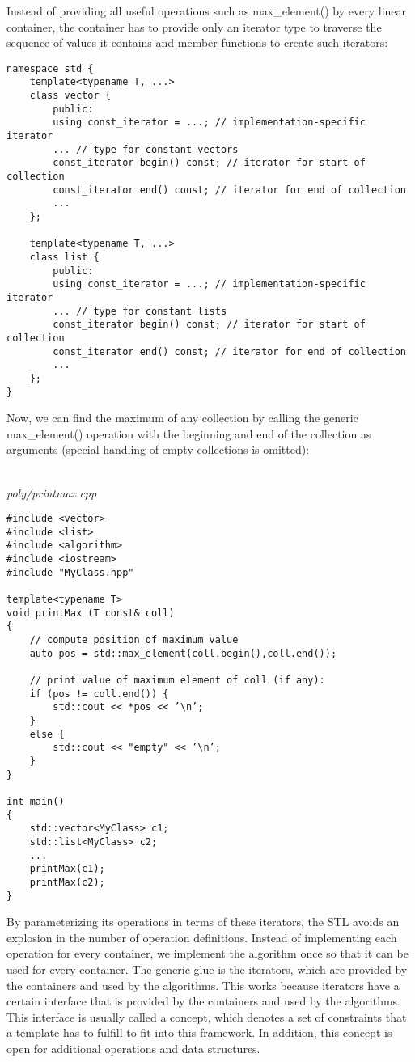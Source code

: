 Instead of providing all useful operations such as max\_element() by every linear container, the container has to provide only an iterator type to traverse the sequence of values it contains and member functions to create such iterators:

\begin{lstlisting}[style=styleCXX]
namespace std {
	template<typename T, ...>
	class vector {
		public:
		using const_iterator = ...; // implementation-specific iterator
		... // type for constant vectors
		const_iterator begin() const; // iterator for start of collection
		const_iterator end() const; // iterator for end of collection
		...
	};

	template<typename T, ...>
	class list {
		public:
		using const_iterator = ...; // implementation-specific iterator
		... // type for constant lists
		const_iterator begin() const; // iterator for start of collection
		const_iterator end() const; // iterator for end of collection
		...
	};
}
\end{lstlisting}

Now, we can find the maximum of any collection by calling the generic max\_element() operation with the beginning and end of the collection as arguments (special handling of empty collections is omitted):

\hspace*{\fill} \\ %
\noindent
\textit{poly/printmax.cpp}
\begin{lstlisting}[style=styleCXX]
#include <vector>
#include <list>
#include <algorithm>
#include <iostream>
#include "MyClass.hpp"

template<typename T>
void printMax (T const& coll)
{
	// compute position of maximum value
	auto pos = std::max_element(coll.begin(),coll.end());
	
	// print value of maximum element of coll (if any):
	if (pos != coll.end()) {
		std::cout << *pos << ’\n’;
	}
	else {
		std::cout << "empty" << ’\n’;
	}
}

int main()
{
	std::vector<MyClass> c1;
	std::list<MyClass> c2;
	...
	printMax(c1);
	printMax(c2);
}
\end{lstlisting}

By parameterizing its operations in terms of these iterators, the STL avoids an explosion in the number of operation definitions. Instead of implementing each operation for every container, we implement the algorithm once so that it can be used for every container. The generic glue is the iterators, which are provided by the containers and used by the algorithms. This works because iterators have a certain interface that is provided by the containers and used by the algorithms. This interface is usually called a concept, which denotes a set of constraints that a template has to fulfill to fit into this framework. In addition, this concept is open for additional operations and data structures.

